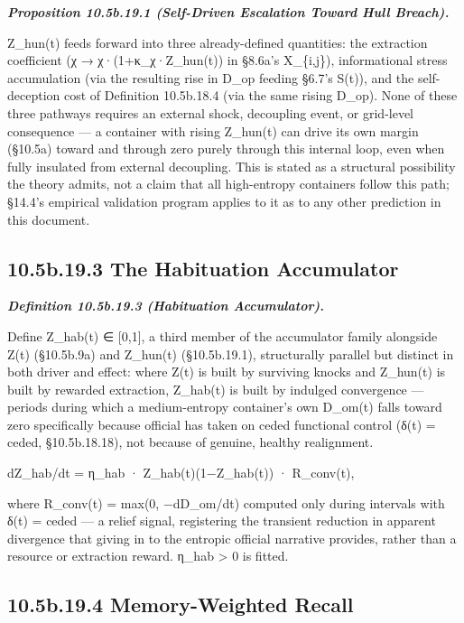 \documentclass[
]{article}
\begin{document}
\emph{\textbf{Proposition 10.5b.19.1 (Self-Driven Escalation Toward Hull
Breach).}}

Z\_hun(t) feeds forward into three already-defined quantities: the
extraction coefficient (χ → χ·(1+κ\_χ·Z\_hun(t)) in §8.6a's X\_\{i,j\}),
informational stress accumulation (via the resulting rise in D\_op
feeding §6.7's S(t)), and the self-deception cost of Definition
10.5b.18.4 (via the same rising D\_op). None of these three pathways
requires an external shock, decoupling event, or grid-level consequence
--- a container with rising Z\_hun(t) can drive its own margin (§10.5a)
toward and through zero purely through this internal loop, even when
fully insulated from external decoupling. This is stated as a structural
possibility the theory admits, not a claim that all high-entropy
containers follow this path; §14.4's empirical validation program
applies to it as to any other prediction in this document.

\hypertarget{b.19.3-the-habituation-accumulator}{%
\subsection{10.5b.19.3 The Habituation
Accumulator}\label{b.19.3-the-habituation-accumulator}}

\emph{\textbf{Definition 10.5b.19.3 (Habituation Accumulator).}}

Define Z\_hab(t) ∈ {[}0,1{]}, a third member of the accumulator family
alongside Z(t) (§10.5b.9a) and Z\_hun(t) (§10.5b.19.1), structurally
parallel but distinct in both driver and effect: where Z(t) is built by
surviving knocks and Z\_hun(t) is built by rewarded extraction,
Z\_hab(t) is built by indulged convergence --- periods during which a
medium-entropy container's own D\_om(t) falls toward zero specifically
because official has taken on ceded functional control (δ(t) = ceded,
§10.5b.18.18), not because of genuine, healthy realignment.

dZ\_hab/dt = η\_hab · Z\_hab(t)(1−Z\_hab(t)) · R\_conv(t),

where R\_conv(t) = max(0, −dD\_om/dt) computed only during intervals
with δ(t) = ceded --- a relief signal, registering the transient
reduction in apparent divergence that giving in to the entropic official
narrative provides, rather than a resource or extraction reward. η\_hab
\textgreater{} 0 is fitted.

\hypertarget{b.19.4-memory-weighted-recall}{%
\subsection{10.5b.19.4 Memory-Weighted
Recall}\label{b.19.4-memory-weighted-recall}}
\end{document}
